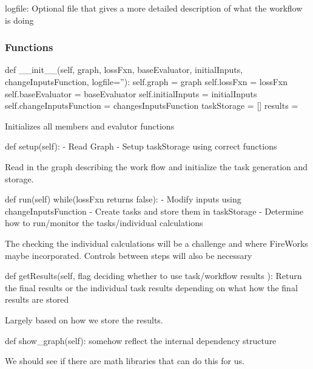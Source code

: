 \documentclass [notitlepage, 12pt, a4paper]{article}
\begin{document}
    logfile: Optional file that gives a more detailed description of what the workflow is doing
\subsubsection{Functions}
\begin{python}
def __init__(self, graph, lossFxn, baseEvaluator, initialInputs,
             changeInputsFunction, logfile=''):
    self.graph = graph
    self.lossFxn = lossFxn
    self.baseEvaluator = baseEvaluator
    self.initialInputs = initialInputs
    self.changeInputsFunction = changesInputsFunction
    taskStorage = []
    results = {}

\end{python}
Initializes all members and evalutor functions

\begin{python}
def setup(self):
    - Read Graph
    - Setup taskStorage using correct functions
\end{python}
Read in the graph describing the work flow and initialize the task generation and storage.

\begin{python}
def run(self)
    while(lossFxn returns false):
        - Modify inputs using changeInputsFunction
        - Create tasks and store them in taskStorage
        - Determine how to run/monitor the tasks/individual
          calculations
\end{python}
The checking the individual calculations will be a challenge and where FireWorks maybe incorporated.
Controls between steps will also be necessary

\begin{python}
def getResults(self, flag deciding whether to use task/workflow
               results ):
    Return the final results or the individual task results
    depending on what how the final results are stored
\end{python}
Largely based on how we store the results.

\begin{python}
def show_graph(self):
    somehow reflect the internal dependency structure
\end{python}
We should see if there are math libraries that can do this for us.
\end{document}
